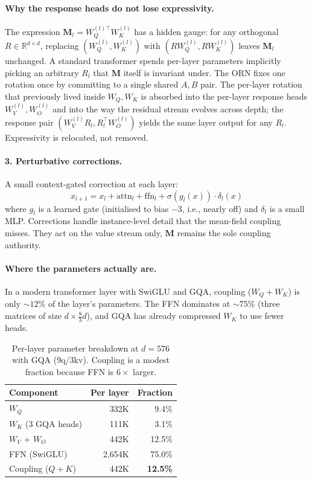 \documentclass[10pt,twocolumn]{article}
\newcommand{\M}{\mathbf{M}}
\newcommand{\R}{\mathbb{R}}
\begin{document}
\paragraph{Why the response heads do not lose expressivity.}
The expression $\M_l = W_Q^{(l)\top} W_K^{(l)}$ has a hidden gauge: for any orthogonal $R \in \R^{d \times d}$, replacing $(W_Q^{(l)}, W_K^{(l)})$ with $(R W_Q^{(l)}, R W_K^{(l)})$ leaves $\M_l$ unchanged.
A standard transformer spends per-layer parameters implicitly picking an arbitrary $R_l$ that $\M$ itself is invariant under.
The ORN fixes one rotation once by committing to a single shared $A, B$ pair.
The per-layer rotation that previously lived inside $W_Q, W_K$ is absorbed into the per-layer response heads $W_V^{(l)}, W_O^{(l)}$ and into the way the residual stream evolves across depth; the response pair $(W_V^{(l)} R_l, R_l^\top W_O^{(l)})$ yields the same layer output for any $R_l$.
Expressivity is relocated, not removed.

\paragraph{3. Perturbative corrections.}
A small context-gated correction at each layer:
\begin{equation}
x_{l+1} = x_l + \text{attn}_l + \text{ffn}_l + \sigma(g_l(x)) \cdot \delta_l(x)
\end{equation}
where $g_l$ is a learned gate (initialised to bias $-3$, i.e., nearly off) and $\delta_l$ is a small MLP.
Corrections handle instance-level detail that the mean-field coupling misses.
They act on the value stream only, $\M$ remains the sole coupling authority.

\paragraph{Where the parameters actually are.}
In a modern transformer layer with SwiGLU and GQA, coupling ($W_Q + W_K$) is only ${\sim}12\%$ of the layer's parameters.
The FFN dominates at ${\sim}75\%$ (three matrices of size $d \times \tfrac{8}{3}d$), and GQA has already compressed $W_K$ to use fewer heads.

\begin{table}[h]
\centering\footnotesize
\begin{tabular}{@{}lrr@{}}
\toprule
\textbf{Component} & \textbf{Per layer} & \textbf{Fraction} \\
\midrule
$W_Q$ & 332K & 9.4\% \\
$W_K$ (3 GQA heads) & 111K & 3.1\% \\
$W_V$ + $W_O$ & 442K & 12.5\% \\
FFN (SwiGLU) & 2,654K & 75.0\% \\
\midrule
Coupling ($Q{+}K$) & 442K & \textbf{12.5\%} \\
\bottomrule
\end{tabular}
\caption{Per-layer parameter breakdown at $d{=}576$ with GQA (9q/3kv).
Coupling is a modest fraction because FFN is $6\times$ larger.}
\label{tab:layer_breakdown}
\end{table}
\end{document}
